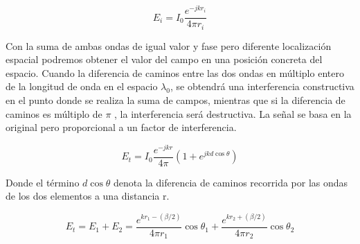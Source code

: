 \begin{equation}
	E_{i}=I_{0}\frac{e^{-jkr_{i}}}{4\pi r_{i}}
	\label{eq:ei}
\end{equation}


\par Con la suma de ambas ondas de igual valor y fase pero diferente localización espacial podremos obtener el valor del campo en una posición concreta del espacio. Cuando la diferencia de caminos entre las dos ondas en múltiplo entero de la longitud de onda en el espacio \textit{$\lambda _{0}$}, se obtendrá una interferencia constructiva en el punto donde se realiza la suma de campos, mientras que si la diferencia de caminos es múltiplo de $\pi$ , la interferencia será destructiva. La señal se basa en la original pero proporcional a un factor de interferencia.

\begin{equation}
	E_{t}=I_{0}\frac{e^{-jkr}}{4\pi}(1+e^{jkd\cos\theta })
	\label{eq:einter}
\end{equation}

Donde el término $d\cos\theta$ denota la diferencia de caminos recorrida por las ondas de los dos elementos a una distancia r.

\begin{equation}
	E_{t}=E_{1}+E_{2}=\frac{    e^{kr_{1}-(\beta/2)} }{ 4\pi r_{1}  }\cos\theta _{1}+\frac{    e^{kr_{2}+(\beta/2)} }{ 4\pi r_{2}  }\cos\theta _{2}
	\label{eq:ei}
\end{equation}